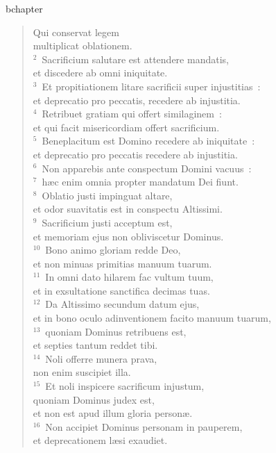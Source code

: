 bchapter\begin{verse}\vspace{-19pt}Qui conservat legem\\ multiplicat oblationem.\\
${}^{2}$~Sacrificium salutare est attendere mandatis,\\ et discedere ab omni iniquitate.\\
${}^{3}$~Et propitiationem litare sacrificii super injustitias~:\\ et deprecatio pro peccatis, recedere ab injustitia.\\
${}^{4}$~Retribuet gratiam qui offert similaginem~:\\ et qui facit misericordiam offert sacrificium.\\
${}^{5}$~Beneplacitum est Domino recedere ab iniquitate~:\\ et deprecatio pro peccatis recedere ab injustitia.\\
${}^{6}$~Non apparebis ante conspectum Domini vacuus~:\\
${}^{7}$~h\ae c enim omnia propter mandatum Dei fiunt.\\
${}^{8}$~Oblatio justi impinguat altare,\\ et odor suavitatis est in conspectu Altissimi.\\
${}^{9}$~Sacrificium justi acceptum est,\\ et memoriam ejus non obliviscetur Dominus.\\
${}^{10}$~Bono animo gloriam redde Deo,\\ et non minuas primitias manuum tuarum.\\
${}^{11}$~In omni dato hilarem fac vultum tuum,\\ et in exsultatione sanctifica decimas tuas.\\
${}^{12}$~Da Altissimo secundum datum ejus,\\ et in bono oculo adinventionem facito manuum tuarum,\\
${}^{13}$~quoniam Dominus retribuens est,\\ et septies tantum reddet tibi.\\
${}^{14}$~Noli offerre munera prava,\\ non enim suscipiet illa.\\
${}^{15}$~Et noli inspicere sacrificum injustum,\\ quoniam Dominus judex est,\\ et non est apud illum gloria person\ae .\\
${}^{16}$~Non accipiet Dominus personam in pauperem,\\ et deprecationem l\ae si exaudiet.\\

\end{verse}
